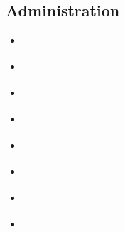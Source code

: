 \documentclass[letterpaper,10pt,french]{sphinxmanual}
\begin{document}
\subsection{Administration}
\label{\detokenize{doc_admin/catalogue:administration}}
\begin{sphinxShadowBox}
\begin{itemize}
\item {} 
\sphinxAtStartPar
{}\label{\detokenize{doc_admin/catalogue:id7}}{\hyperref[\detokenize{doc_admin/catalogue:metadonnees-et-modeles}]{}}

\item {} 
\sphinxAtStartPar
{}\label{\detokenize{doc_admin/catalogue:id8}}{\hyperref[\detokenize{doc_admin/catalogue:utilisateur-et-groupe}]{}}

\item {} 
\sphinxAtStartPar
{}\label{\detokenize{doc_admin/catalogue:id9}}{\hyperref[\detokenize{doc_admin/catalogue:moissonnage}]{}}

\item {} 
\sphinxAtStartPar
{}\label{\detokenize{doc_admin/catalogue:id10}}{\hyperref[\detokenize{doc_admin/catalogue:statistique-et-statut}]{}}

\item {} 
\sphinxAtStartPar
{}\label{\detokenize{doc_admin/catalogue:id11}}{\hyperref[\detokenize{doc_admin/catalogue:rapports}]{}}

\item {} 
\sphinxAtStartPar
{}\label{\detokenize{doc_admin/catalogue:id12}}{\hyperref[\detokenize{doc_admin/catalogue:thesaurus}]{}}

\item {} 
\sphinxAtStartPar
{}\label{\detokenize{doc_admin/catalogue:id13}}{\hyperref[\detokenize{doc_admin/catalogue:parametres}]{}}

\item {} 
\sphinxAtStartPar
{}\label{\detokenize{doc_admin/catalogue:id14}}{\hyperref[\detokenize{doc_admin/catalogue:outils}]{}}

\end{itemize}
\end{sphinxShadowBox}
\end{document}
